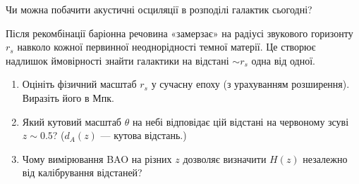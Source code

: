 \begin{problem}{Чи можна побачити акустичні осциляції в розподілі галактик сьогодні?}

Після рекомбінації баріонна речовина «замерзає» на радіусі звукового
горизонту $r_s$ навколо кожної первинної неоднорідності темної матерії.
Це створює надлишок ймовірності знайти галактики на відстані $\sim r_s$
одна від одної.

\begin{enumerate}
    \item Оцініть фізичний масштаб $r_s$ у сучасну епоху (з урахуванням розширення).
          Виразіть його в Мпк.
    \item Який кутовий масштаб $\theta$ на небі відповідає цій відстані
          на червоному зсуві $z \sim 0.5$? ($d_A(z)$ — кутова відстань.)
    \item Чому вимірювання BAO на різних $z$ дозволяє визначити $H(z)$
          незалежно від калібрування відстаней?
\end{enumerate}
\end{problem}